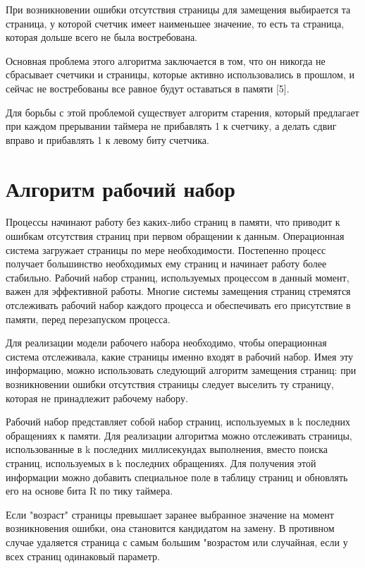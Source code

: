 При возникновении ошибки отсутствия страницы для замещения выбирается та страница, у которой счетчик имеет наименьшее значение, то есть та
страница, которая дольше всего не была востребована.

Основная проблема этого алгоритма заключается в том, что он никогда не сбрасывает счетчики и страницы, которые активно использовались в
прошлом, и сейчас не востребованы все равное будут оставаться в памяти [5].

Для борьбы с этой проблемой существует алгоритм старения, который предлагает при каждом прерывании таймера не прибавлять 1 к счетчику, а
делать сдвиг вправо и прибавлять 1 к левому биту счетчика.

\section{Алгоритм рабочий набор}

Процессы начинают работу без каких-либо страниц в памяти,
что приводит к ошибкам отсутствия страниц при первом обращении к данным.
Операционная система загружает страницы по мере необходимости. Постепенно процесс получает большинство необходимых ему страниц и начинает работу более стабильно. Рабочий набор страниц, используемых процессом в данный
момент, важен для эффективной работы. Многие системы замещения страниц
стремятся отслеживать рабочий набор каждого процесса и обеспечивать его
присутствие в памяти, перед перезапуском процесса.

Для реализации модели рабочего набора необходимо, чтобы операционная система отслеживала, какие страницы именно входят в рабочий набор.
Имея эту информацию, можно использовать следующий алгоритм замещения
страниц: при возникновении ошибки отсутствия страницы следует выселить
ту страницу, которая не принадлежит рабочему набору.

Рабочий набор представляет собой набор страниц, используемых в k
последних обращениях к памяти. Для реализации алгоритма можно отслеживать страницы, использованные в k последних миллисекундах выполнения,
вместо поиска страниц, используемых в k последних обращениях. Для получения этой информации можно добавить специальное поле в таблицу страниц
и обновлять его на основе бита R по тику таймера.

Если "возраст" страницы превышает заранее выбранное значение на
момент возникновения ошибки, она становится кандидатом на замену. В
противном случае удаляется страница с самым большим "возрастом или случайная, если у всех страниц одинаковый параметр.

